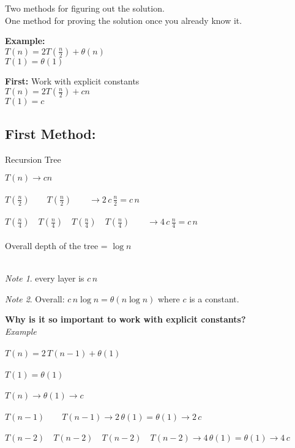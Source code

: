 \documentclass{article}
\theoremstyle{definition}
\theoremstyle{remark}
\newtheorem{note}{Note}[section]
\theoremstyle{plain}
\begin{document}
Two methods for figuring out the solution.\\
One method for proving the solution once you already know it.

\textbf{Example:} \\
$T(n) = 2 T(\frac{n}{2}) + \theta (n)$\\
$T(1) = \theta (1) $

\textbf{First:} Work with explicit constants\\
$T(n) = 2 T(\frac{n}{2}) + cn$\\
$T(1) = c$

\subsection{First Method:} Recursion Tree

$T(n) \rightarrow cn$\\\\
$T(\frac{n}{2}) \qquad T(\frac{n}{2}) \qquad \rightarrow 2 \,c \,\frac{n}{2} = c\,n$\\\\
$T(\frac{n}{4}) \quad T(\frac{n}{4}) \quad T(\frac{n}{4}) \quad T(\frac{n}{4}) \qquad \rightarrow 4 \,c \,\frac{n}{4} = c\,n$\\\\

Overall depth of the tree = $\log n$\\\\
\begin{note}
every layer is $c\,n$
\end{note}

\begin{note}
Overall:  $c \, n \log n = \theta (n \log n)$ where $c$ is a constant.
\end{note}

\textbf{Why is it so important to work with explicit constants?}\\

\textsl{Example}\\\\
$T(n) = 2\,T(n-1) + \theta (1)$\\\\
$T(1) = \theta(1)$\\\\

$T(n) \rightarrow \theta(1) \rightarrow c$\\\\
$T(n-1) \qquad T(n-1) \rightarrow 2\,\theta(1) = \theta(1) \rightarrow 2\,c$\\\\
$T(n-2) \quad T(n-2) \quad T(n-2) \quad T(n-2) \rightarrow 4\,\theta(1) = \theta(1) \rightarrow 4\,c$\\\\
\end{document}
